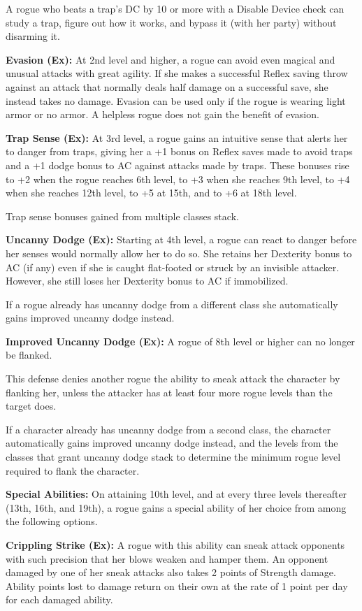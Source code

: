 A rogue who beats a trap’s DC by 10 or more with a Disable Device check can study a trap, figure out how it works, and bypass it (with her party) without disarming it.

\textbf{Evasion (Ex):} At 2nd level and higher, a rogue can avoid even magical and unusual attacks with great agility. If she makes a successful Reflex saving throw against an attack that normally deals half damage on a successful save, she instead takes no damage. Evasion can be used only if the rogue is wearing light armor or no armor. A helpless rogue does not gain the benefit of evasion.

\textbf{Trap Sense (Ex):} At 3rd level, a rogue gains an intuitive sense that alerts her to danger from traps, giving her a +1 bonus on Reflex saves made to avoid traps and a +1 dodge bonus to AC against attacks made by traps. These bonuses rise to +2 when the rogue reaches 6th level, to +3 when she reaches 9th level, to +4 when she reaches 12th level, to +5 at 15th, and to +6 at 18th level.

Trap sense bonuses gained from multiple classes stack.

\textbf{Uncanny Dodge (Ex):} Starting at 4th level, a rogue can react to danger before her senses would normally allow her to do so. She retains her Dexterity bonus to AC (if any) even if she is caught flat-footed or struck by an invisible attacker. However, she still loses her Dexterity bonus to AC if immobilized.

If a rogue already has uncanny dodge from a different class she automatically gains improved uncanny dodge instead.

\textbf{Improved Uncanny Dodge (Ex):} A rogue of 8th level or higher can no longer be flanked.

This defense denies another rogue the ability to sneak attack the character by flanking her, unless the attacker has at least four more rogue levels than the target does.

If a character already has uncanny dodge from a second class, the character automatically gains improved uncanny dodge instead, and the levels from the classes that grant uncanny dodge stack to determine the minimum rogue level required to flank the character.

\textbf{Special Abilities:} On attaining 10th level, and at every three levels thereafter (13th, 16th, and 19th), a rogue gains a special ability of her choice from among the following options.

\textbf{Crippling Strike (Ex):} A rogue with this ability can sneak attack opponents with such precision that her blows weaken and hamper them. An opponent damaged by one of her sneak attacks also takes 2 points of Strength damage. Ability points lost to damage return on their own at the rate of 1 point per day for each damaged ability.

